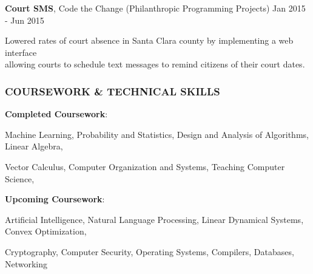 \documentclass[11pt,letterpaper]{article}%
\begin{document}
\vspace{-.3em}
\hspace{.6em}  
{\bf Court SMS}, Code the Change (Philanthropic Programming Projects) \hfill Jan 2015 - Jun 2015
\vspace{-.6em}
\begin{itemize*}
\item Lowered rates of court absence in Santa Clara county by implementing a web interface \\allowing courts to schedule text messages to remind citizens of their court dates.
\end{itemize*}


\vspace{-1em}
\hrulefill 
\subsubsection*{COURSEWORK \& TECHNICAL SKILLS}

\hspace{.6em} 
{\bf Completed Coursework}: 

\hspace{2.4em}
Machine Learning,
Probability and Statistics, 
Design and Analysis of Algorithms, 
Linear Algebra,

\hspace{2.4em}
Vector Calculus,
Computer Organization and Systems, 
Teaching Computer Science,

\hspace{.6em}
{\bf Upcoming Coursework}:

\hspace{2.4em}
Artificial Intelligence, 
Natural Language Processing,
Linear Dynamical Systems,
Convex Optimization,

\hspace{2.4em}
Cryptography, 
Computer Security,
Operating Systems,
Compilers,
Databases,
Networking
\end{document}
